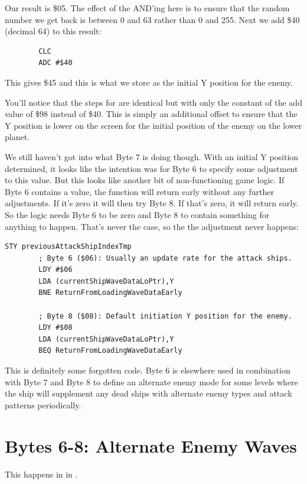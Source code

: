 Our result is \$05. The effect of the AND'ing here is to ensure that the random number we get back is between 0 and 63 rather
than 0 and 255. Next we add \$40 (decimal 64) to this result:

\begin{lstlisting}
        CLC
        ADC #$40
\end{lstlisting}

This gives \$45 and this is what we store as the initial Y position for the enemy.

You'll notice that the steps for  are identical but with only the constant of the
add value of \$98 instead of \$40. This is simply an additional offset to ensure that the Y position is lower on the screen
for the initial position of the enemy on the lower planet.

We still haven't got into what Byte 7 is doing though. With an initial Y position determined, it looks like the intention was
for Byte 6 to specify some adjustment to this value. But this looks like another bit of non-functioning game logic. If
Byte 6 contains a value, the function will return early without any further adjustments. If it's zero it will then try
Byte 8. If that's zero, it will return early. So the logic needs Byte 6 to be zero and Byte 8 to contain something for 
anything to happen. That's never the case, so the the adjustment never happens:

\begin{lstlisting}[caption= An adjustment that never happens. Byte 6 and Byte 8 are never set in this way.]
        STY previousAttackShipIndexTmp
        ; Byte 6 ($06): Usually an update rate for the attack ships.
        LDY #$06
        LDA (currentShipWaveDataLoPtr),Y
        BNE ReturnFromLoadingWaveDataEarly

        ; Byte 8 ($08): Default initiation Y position for the enemy. 
        LDY #$08
        LDA (currentShipWaveDataLoPtr),Y
        BEQ ReturnFromLoadingWaveDataEarly
\end{lstlisting}

This is definitely some forgotten code. Byte 6 is elsewhere used in combination with Byte 7 and Byte 8 to define an alternate
enemy mode for some levels where the ship will supplement any dead ships with alternate enemy types and attack patterns periodically.


\section{Bytes 6-8: Alternate Enemy Waves}
This happens in  in . 

